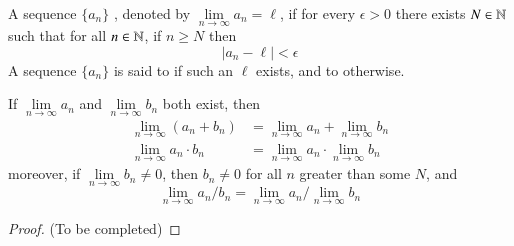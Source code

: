 \documentclass[12pt, a4paper, oneside, openright, titlepage]{book}
\begin{document}
\begin{defn}
    A sequence $\{a_n\}$ , denoted by $\lim\limits_{n\rightarrow \infty}a_n = \ell$, if for every $\epsilon > 0$ there exists $N \in \mathbb N$ such that for all $n \in \mathbb N$, if $n \geq N$ then \begin{equation*}
        |a_n - \ell| < \epsilon
    \end{equation*}
    A sequence $\{a_n\}$ is said to  if such an $\ell$ exists, and to  otherwise.
\end{defn}

\begin{thm}
    If $\lim\limits_{n\rightarrow \infty}a_n$ and $\lim\limits_{n\rightarrow \infty}b_n$ both exist, then \begin{align*}
        \lim\limits_{n\rightarrow \infty}(a_n+b_n) &= \lim\limits_{n\rightarrow \infty}a_n + \lim\limits_{n\rightarrow \infty}b_n \\
        \lim\limits_{n\rightarrow \infty}a_n\cdot b_n &= \lim\limits_{n\rightarrow \infty}a_n\cdot \lim\limits_{n\rightarrow \infty} b_n 
    \end{align*}
    moreover, if $\lim\limits_{n\rightarrow \infty}b_n\neq 0$, then $b_n \neq 0$ for all $n$ greater than some $N$, and \begin{equation*}
        \lim\limits_{n\rightarrow \infty}a_n/b_n = \lim\limits_{n\rightarrow \infty}a_n/\lim\limits_{n\rightarrow \infty}b_n
    \end{equation*}
\end{thm}
\begin{proof}
    (To be completed)
\end{proof}
\end{document}
